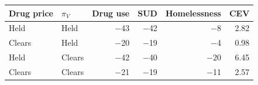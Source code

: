\begin{tabular}{@{}llrrrr@{}}
\toprule
Drug price & $\pi_V$ & Drug use & SUD & Homelessness & CEV \\
\midrule
Held & Held & $-$43 & $-$42 & $-$8 & 2.82 \\
Clears & Held & $-$20 & $-$19 & $-$4 & 0.98 \\
Held & Clears & $-$42 & $-$40 & $-$20 & 6.45 \\
Clears & Clears & $-$21 & $-$19 & $-$11 & 2.57 \\
\bottomrule
\end{tabular}
